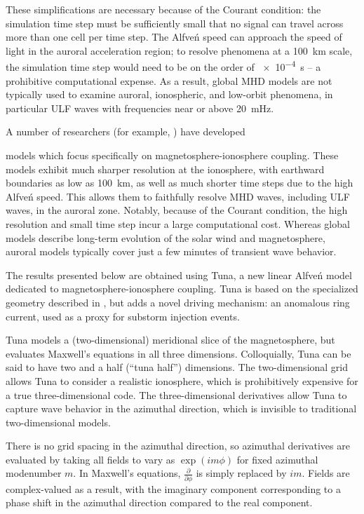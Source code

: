 \documentclass[draft,linenumbers]{agujournal}
\begin{document}
These simplifications are necessary because of the Courant condition: the simulation time step must be sufficiently small that no signal can travel across more than one cell per time step. The Alfve\'n speed can approach the speed of light in the auroral acceleration region; to resolve phenomena at a \SI{100}{\km} scale, the simulation time step would need to be on the order of \SI{e-4}{\s} -- a prohibitive computational expense. As a result, global MHD models are not typically used to examine auroral, ionospheric, and low-orbit phenomena\citep{luhr_2016}, in particular ULF waves with frequencies near or above \SI{20}{\mHz}.

A number of researchers (for example, \citet{mallinckrodt_1978,goertz_1979,streltsov_2003,lee_1989,song_2006,lysak_2004,woodroffe_2012,waters_2013,mceachern_2016}) have developed

models which focus specifically on magnetosphere-ionosphere coupling. These models exhibit much sharper resolution at the ionosphere, with earthward boundaries as low as \SI{100}{\km}, as well as much shorter time steps due to the high Alfve\'n speed. This allows them to faithfully resolve MHD waves, including ULF waves, in the auroral zone. Notably, because of the Courant condition, the high resolution and small time step incur a large computational cost. Whereas global models describe long-term evolution of the solar wind and magnetosphere, auroral models typically cover just a few minutes of transient wave behavior.

The results presented below are obtained using Tuna, a new linear Alfve\'n model dedicated to magnetosphere-ionosphere coupling. Tuna is based on the specialized geometry described in \citet{lysak_2013}, but adds a novel driving mechanism: an anomalous ring current, used as a proxy for substorm injection events.

Tuna models a (two-dimensional) meridional slice of the magnetosphere, but evaluates Maxwell's equations in all three dimensions. Colloquially, Tuna can be said to have two and a half (``tuna half'') dimensions. The two-dimensional grid allows Tuna to consider a realistic ionosphere, which is prohibitively expensive for a true three-dimensional code. The three-dimensional derivatives allow Tuna to capture wave behavior in the azimuthal direction, which is invisible to traditional two-dimensional models.

There is no grid spacing in the azimuthal direction, so azimuthal derivatives are evaluated by taking all fields to vary as $\exp \left(i m \phi\right)$ for fixed azimuthal modenumber $m$. In Maxwell's equations, $\frac{\partial}{\partial \phi}$ is simply replaced by $i m$. Fields are complex-valued as a result, with the imaginary component corresponding to a phase shift in the azimuthal direction compared to the real component.
\end{document}

